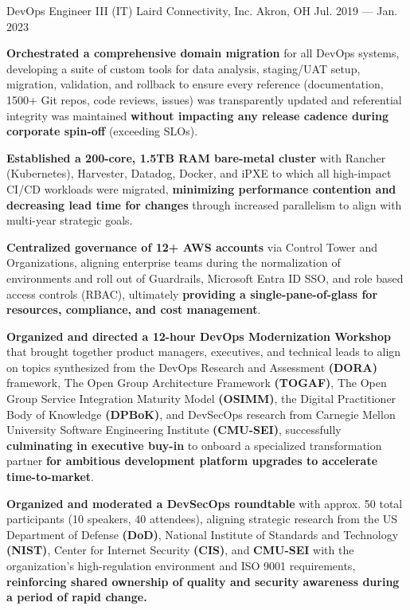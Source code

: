 \begin{cventries}
    \cventry
        { DevOps Engineer III (IT) }
        { Laird Connectivity, Inc. }
        { Akron, OH }
        { Jul. 2019 --- Jan. 2023 }
        {
            \begin{cvitems}
                \item{\textbf{Orchestrated a comprehensive domain migration} for all DevOps systems, developing a suite of custom tools for data analysis, staging/UAT setup, migration, validation, and rollback to ensure every reference (documentation, 1500+ Git repos, code reviews, issues) was transparently updated and referential integrity was maintained \textbf{without impacting any release cadence during corporate spin-off} (exceeding SLOs).}
                \item{\textbf{Established a 200-core, 1.5TB RAM bare-metal cluster} with Rancher (Kubernetes), Harvester, Datadog, Docker, and iPXE to which all high-impact CI/CD workloads were migrated, \textbf{minimizing performance contention and decreasing lead time for changes} through increased parallelism to align with multi-year strategic goals.}
                \item{\textbf{Centralized governance of 12+ AWS accounts} via Control Tower and Organizations, aligning enterprise teams during the normalization of environments and roll out of Guardrails, Microsoft Entra ID SSO, and role based access controls (RBAC), ultimately \textbf{providing a single-pane-of-glass for resources, compliance, and cost management}.}
                \item{\textbf{Organized and directed a 12-hour DevOps Modernization Workshop} that brought together product managers, executives, and technical leads to align on topics synthesized from the DevOps Research and Assessment \textbf{(DORA)} framework, The Open Group Architecture Framework \textbf{(TOGAF)}, The Open Group Service Integration Maturity Model \textbf{(OSIMM)}, the Digital Practitioner Body of Knowledge \textbf{(DPBoK)}, and DevSecOps research from Carnegie Mellon University Software Engineering Institute \textbf{(CMU-SEI)}, successfully \textbf{culminating in executive buy-in} to onboard a specialized transformation partner \textbf{for ambitious development platform upgrades to accelerate time-to-market}.}
                \item{\textbf{Organized and moderated a DevSecOps roundtable} with approx. 50 total participants (10 speakers, 40 attendees), aligning strategic research from the US Department of Defense \textbf{(DoD)}, National Institute of Standards and Technology \textbf{(NIST)}, Center for Internet Security \textbf{(CIS)}, and \textbf{CMU-SEI} with the organization's high-regulation environment and ISO 9001 requirements, \textbf{reinforcing shared ownership of quality and security awareness during a period of rapid change.}}
            \end{cvitems}
        }
\end{cventries}
